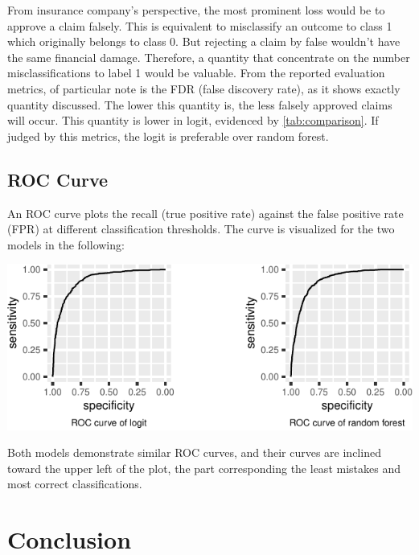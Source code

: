 \documentclass{article}
\begin{document}
From insurance company's perspective, the most prominent loss would be
to approve a claim falsely. This is equivalent to misclassify an outcome
to class 1 which originally belongs to class 0. But rejecting a claim by
false wouldn't have the same financial damage. Therefore, a quantity
that concentrate on the number misclassifications to label 1 would be
valuable. From the reported evaluation metrics, of particular note is
the FDR (false discovery rate), as it shows exactly quantity discussed.
The lower this quantity is, the less falsely approved claims will occur.
This quantity is lower in logit, evidenced by \ref{tab:comparison}. If
judged by this metrics, the logit is preferable over random forest.

\hypertarget{roc-curve}{%
\subsection{ROC Curve}\label{roc-curve}}

An ROC curve plots the recall (true positive rate) against the false
positive rate (FPR) at different classification thresholds. The curve is
visualized for the two models in the following:

\begin{center}\includegraphics{report_files/figure-latex/unnamed-chunk-20-1} \end{center}

Both models demonstrate similar ROC curves, and their curves are
inclined toward the upper left of the plot, the part corresponding the
least mistakes and most correct classifications.

\hypertarget{conclusion}{%
\section{Conclusion}\label{conclusion}}
\end{document}
